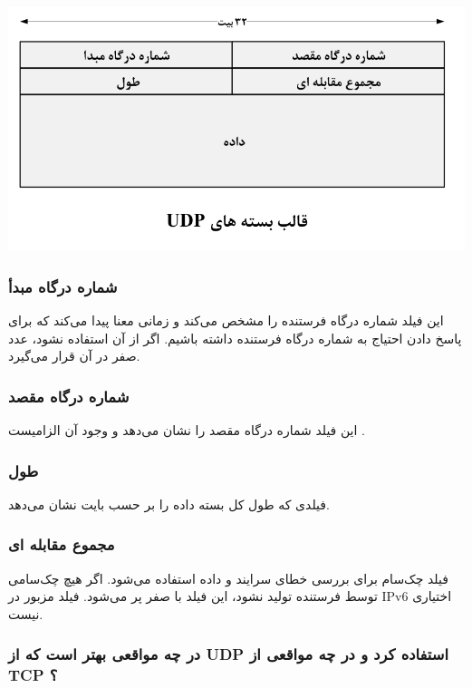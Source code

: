 \documentclass[12pt]{book}
\begin{document}
 
 \begin{center}
	\includegraphics[scale=0.6]{./udp_1.png}
\end{center}
 
 
\subsubsection{ شماره درگاه مبدأ}
این فیلد شماره درگاه فرستنده را مشخص می‌کند و زمانی معنا پیدا می‌کند که برای پاسخ دادن احتیاج به شماره درگاه فرستنده داشته باشیم. اگر از آن استفاده نشود، عدد صفر در آن قرار می‌گیرد.

\subsubsection{شماره درگاه مقصد}
این فیلد شماره درگاه مقصد را نشان می‌دهد و وجود آن الزامیست . 
\subsubsection{طول}
    فیلدی که طول کل بسته داده را بر حسب بایت نشان می‌دهد. 

\subsubsection{مجموع مقابله ای}
    فیلد چک‌سام برای بررسی خطای سرایند و داده استفاده می‌شود. اگر هیچ چک‌سامی توسط فرستنده تولید نشود، این فیلد با صفر پر می‌شود. فیلد مزبور در IPv6 اختیاری نیست.





\subsubsection{
 در چه مواقعی بهتر است که از UDP استفاده کرد و در چه مواقعی از TCP ؟
}
\end{document}
